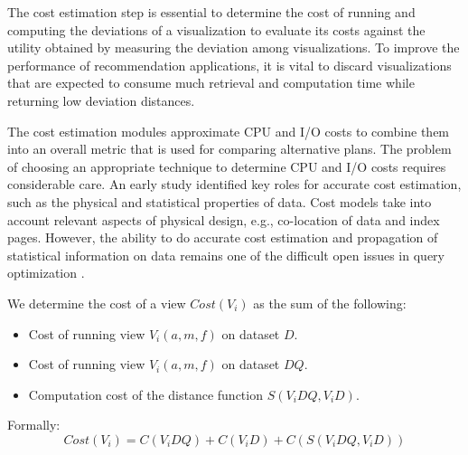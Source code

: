 The cost estimation step is essential to determine the cost of running and computing the deviations of a visualization to evaluate its costs against 
the utility obtained by measuring the deviation among visualizations. 
%
To improve the performance of recommendation applications, it is vital to discard visualizations that are expected to consume much retrieval and computation time while returning low deviation distances.
%

The cost estimation modules approximate CPU and I/O costs to combine them into an overall metric that is used for 
comparing alternative plans. 
%
The problem of choosing an appropriate technique to determine CPU and I/O costs requires considerable care. 
%
An early study \cite{Mackert:1986:ROV:16856.16863} identified key roles for accurate cost estimation, such as the physical and statistical properties of data.
%
%
Cost models take into account relevant aspects of physical design, e.g., co-location of data and index pages. 
%
However, the ability to do accurate cost estimation and propagation of statistical information on data remains one of the difficult open issues 
in query optimization \cite{Chaudhuri:1998:OQO:275487.275492}.
%

We determine the cost of a view $Cost(V_i)$ as the sum of the following: 
\begin{itemize}
	\item Cost of running view $V_i(a,m,f)$ on dataset $D$.
	\item Cost of running view  $V_i(a,m,f)$ on dataset $DQ$.
	\item Computation cost of the distance function $S(V_i DQ, V_i D)$.
\end{itemize}
Formally:
\begin{equation}
\label{eq:cost_view}
Cost(V_i)= C(V_i DQ) + C(V_i D) +  C(S(V_i DQ, V_i D))
\end{equation}
%

